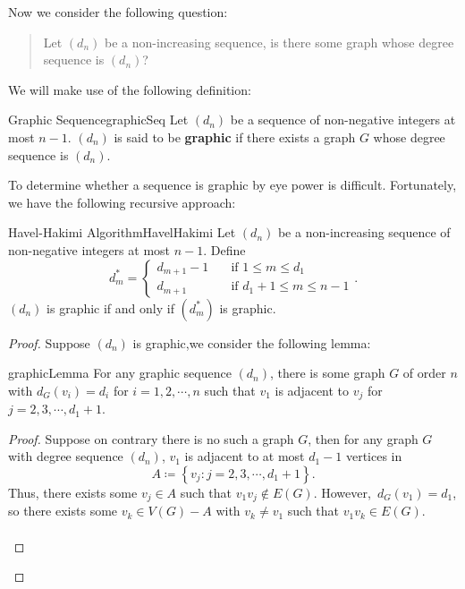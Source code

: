 \documentclass[math, code]{amznotes}
\theoremstyle{remark}
\begin{document}
Now we consider the following question:
\begin{quote}
    Let $(d_n)$ be a non-increasing sequence, is there some graph whose degree sequence is $(d_n)$?
\end{quote}
We will make use of the following definition:
\begin{dfnbox}{Graphic Sequence}{graphicSeq}
    Let $(d_n)$ be a sequence of non-negative integers at most $n - 1$. $(d_n)$ is said to be {\color{red} \textbf{graphic}} if there exists a graph $G$ whose degree sequence is $(d_n)$.
\end{dfnbox}
To determine whether a sequence is graphic by eye power is difficult. Fortunately, we have the following recursive approach:
\begin{thmbox}{Havel-Hakimi Algorithm}{HavelHakimi}
    Let $(d_n)$ be a non-increasing sequence of non-negative integers at most $n - 1$. Define
    \begin{equation*}
        d^*_m = \begin{cases}
            d_{m + 1} - 1 & \quad\textrm{if } 1 \leq m \leq d_1 \\
            d_{m + 1} & \quad\textrm{if } d_1 + 1 \leq m \leq n - 1
        \end{cases}.
    \end{equation*}
    $(d_n)$ is graphic if and only if $\left(d^*_m\right)$ is graphic.
    \tcblower
    \begin{proof}
        Suppose $(d_n)$ is graphic,we consider the following lemma:
        \begin{lembox}{}{graphicLemma}
            For any graphic sequence $(d_n)$, there is some graph $G$ of order $n$ with $d_G(v_i) = d_i$ for $i = 1, 2, \cdots, n$ such that $v_1$ is adjacent to $v_j$ for $j = 2, 3, \cdots, d_1 + 1$.
            \tcblower
            \begin{proof}
                Suppose on contrary there is no such a graph $G$, then for any graph $G$ with degree sequence $(d_n)$, $v_1$ is adjacent to at most $d_1 - 1$ vertices in
                \begin{equation*}
                    A \coloneqq \left\{v_j \colon j = 2, 3, \cdots, d_1 + 1\right\}.
                \end{equation*}
                Thus, there exists some $v_j \in A$ such that $v_1v_j \notin E(G)$. However,~$d_G(v_1) = d_1$, so there exists some $v_k \in V(G) - A$ with $v_k \neq v_1$ such that $v_1v_k \in E(G)$.
                \\\\

\end{proof}
\end{lembox}
\end{proof}
\end{thmbox}
\end{document}
